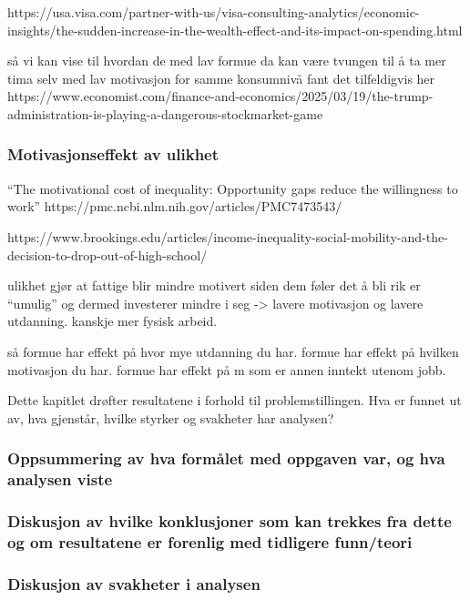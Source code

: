 \documentclass[
  12pt,
  a4paper,
  DIV=11,
  numbers=noendperiod]{scrartcl}
\begin{document}
https://usa.visa.com/partner-with-us/visa-consulting-analytics/economic-insights/the-sudden-increase-in-the-wealth-effect-and-its-impact-on-spending.html

så vi kan vise til hvordan de med lav formue da kan være tvungen til å
ta mer tima selv med lav motivasjon for samme konsumnivå fant det
tilfeldigvis her
https://www.economist.com/finance-and-economics/2025/03/19/the-trump-administration-is-playing-a-dangerous-stockmarket-game

\subsubsection{Motivasjonseffekt av
ulikhet}\label{motivasjonseffekt-av-ulikhet}

``The motivational cost of inequality: Opportunity gaps reduce the
willingness to work'' https://pmc.ncbi.nlm.nih.gov/articles/PMC7473543/

https://www.brookings.edu/articles/income-inequality-social-mobility-and-the-decision-to-drop-out-of-high-school/

ulikhet gjør at fattige blir mindre motivert siden dem føler det å bli
rik er ``umulig'' og dermed investerer mindre i seg -\textgreater{}
lavere motivasjon og lavere utdanning. kanskje mer fysisk arbeid.

så formue har effekt på hvor mye utdanning du har. formue har effekt på
hvilken motivasjon du har. formue har effekt på m som er annen inntekt
utenom jobb.

Dette kapitlet drøfter resultatene i forhold til problemstillingen. Hva
er funnet ut av, hva gjenstår, hvilke styrker og svakheter har analysen?

\subsubsection{Oppsummering av hva formålet med oppgaven var, og hva
analysen
viste}\label{oppsummering-av-hva-formuxe5let-med-oppgaven-var-og-hva-analysen-viste}

\subsubsection{Diskusjon av hvilke konklusjoner som kan trekkes fra
dette og om resultatene er forenlig med tidligere
funn/teori}\label{diskusjon-av-hvilke-konklusjoner-som-kan-trekkes-fra-dette-og-om-resultatene-er-forenlig-med-tidligere-funnteori}

\subsubsection{Diskusjon av svakheter i
analysen}\label{diskusjon-av-svakheter-i-analysen}
\end{document}
